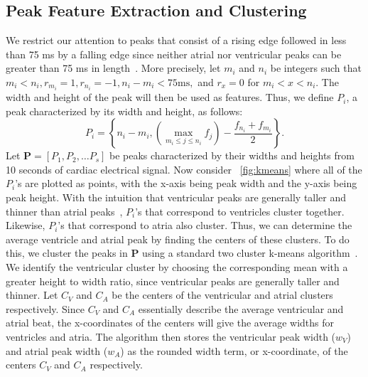 \documentclass[conference]{IEEEtran}
\newcommand{\APW}{\ensuremath{w_A}}
\newcommand{\VPW}{\ensuremath{w_V}}
\begin{document}
\subsection{Peak Feature Extraction and Clustering}
We restrict our attention to peaks that consist of a rising edge
followed in less than 75 ms by a falling edge since 
neither atrial nor ventricular peaks can be greater than 75 ms in length~\cite{cardiac-cycle}.
More precisely, let $m_i$ and $n_i$ be integers such that $m_i < n_i, r_{m_i}=1, r_{n_i} = -1, n_i-m_i < 75 \text{ms},$ and $r_x=0 $ for $m_i < x < n_i$.
The width and height of the peak will then be used as features.  Thus, we define $P_i$, a peak characterized by its width and height, as follows:
\begin{equation*}
	P_i = \left\{n_i-m_i, \left( \max\limits_{m_i\le j\le n_i} f_j \right) - \frac{f_{n_i}+f_{m_i}}{2} \right\}.
\end{equation*}
Let $\mathbf{P} = [P_1, P_2, \dots P_s]$ be peaks characterized by their widths and heights from 10 seconds of cardiac electrical signal.
Now consider \figurename~\ref{fig:kmeans} where all of the $P_i$'s are plotted as points, with the x-axis being peak width and the y-axis being peak height.
With the intuition that ventricular peaks are generally taller and thinner than atrial peaks~\cite{cardiac-cycle},
$P_i$'s that correspond to ventricles cluster together.  Likewise, $P_i$'s that correspond to atria also cluster.
Thus, we can determine the average ventricle and atrial peak by finding the centers of these clusters.  To do this,
we cluster the peaks in $\mathbf{P}$ using a standard two cluster k-means algorithm~\cite{k-means}.  
We identify the ventricular cluster by choosing the corresponding mean 
with a greater height to width ratio, since
ventricular peaks are generally taller and thinner. Let $C_V$ and $C_A$
be the centers of the ventricular and atrial clusters 
respectively. Since $C_V$ and $C_A$ essentially describe the average ventricular and atrial beat, the x-coordinates of the centers will give the average widths for ventricles and atria. The algorithm then stores the ventricular
peak width (\VPW) and atrial peak width (\APW) as the
rounded width term, or x-coordinate, of the centers $C_V$ and $C_A$ respectively.
\end{document}
